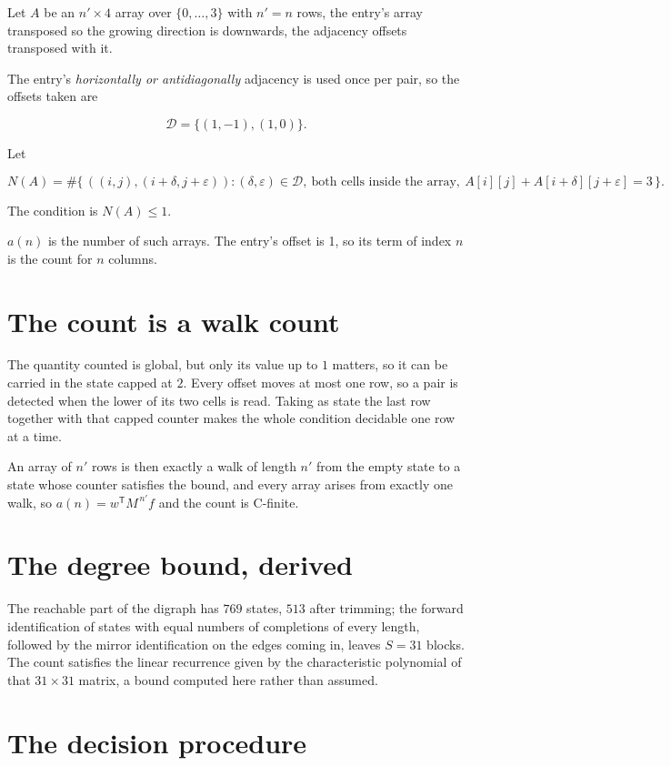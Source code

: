\documentclass[11pt]{article}
\theoremstyle{definition}
\begin{document}
Let $A$ be an $n' \times 4$ array over $\{0,\dots,3\}$ with $n' = n$ rows, the entry's array transposed so the growing direction is downwards, the adjacency offsets transposed with it.

The entry's {\itshape horizontally or antidiagonally} adjacency is used once per pair, so the offsets taken are

\[\mathcal{D} = \{(1,-1), (1,0)\}.\]

Let

\[N(A) = \#\bigl\{\,((i,j),(i{+}\delta,j{+}\varepsilon)) : (\delta,\varepsilon) \in \mathcal{D},\ \text{both cells inside the array},\ A[i][j] + A[i{+}\delta][j{+}\varepsilon] = 3\,\bigr\}.\]

The condition is $N(A) \le 1$.

$a(n)$ is the number of such arrays. The entry's offset is 1, so its term of index $n$ is the count for $n$ columns.

\section{The count is a walk count}

The quantity counted is global, but only its value up to $1$ matters, so it can be carried in the state capped at $2$. Every offset moves at most one row, so a pair is detected when the lower of its two cells is read. Taking as state the last row together with that capped counter makes the whole condition decidable one row at a time.

An array of $n'$ rows is then exactly a walk of length $n'$ from the empty state to a state whose counter satisfies the bound, and every array arises from exactly one walk, so $a(n) = w^{\mathsf T}M^{\,n'}f$ and the count is C-finite.

\section{The degree bound, derived}

The reachable part of the digraph has $769$ states, $513$ after trimming; the forward identification of states with equal numbers of completions of every length, followed by the mirror identification on the edges coming in, leaves $S = 31$ blocks. The count satisfies the linear recurrence given by the characteristic polynomial of that $31\times31$ matrix, a bound computed here rather than assumed.

\section{The decision procedure}
\end{document}
